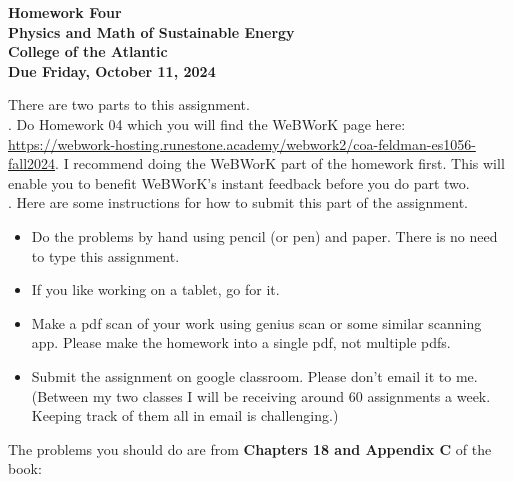 \documentclass[12pt]{article}
\begin{document}
\pagestyle{empty}
 
\begin{center}
{\LARGE {\bf Homework Four}}\\
\bigskip
{\Large {\bf Physics and Math of Sustainable Energy}}\\
\bigskip
{\Large {\bf College of the Atlantic}}\\
\bigskip
{ {\bf Due Friday, October 11, 2024}}\\ 
\end{center}
\medskip


\noindent There are two parts to this assignment.\\

.  Do Homework 04 which you
will find the WeBWorK page here:
\url{https://webwork-hosting.runestone.academy/webwork2/coa-feldman-es1056-fall2024}.
I recommend doing the WeBWorK part of the homework first.  This will
enable you to benefit WeBWorK's instant feedback before you do part
two.\\ 


.  Here are some
instructions for how to submit this part of the assignment.
\begin{itemize}
\item Do the problems by hand using pencil (or pen) and paper.
  There is no need to type this assignment.
\item If you like working on a tablet, go for it. 
\item Make a pdf scan of your work using genius scan or some
  similar scanning app.  Please make the homework into a single
  pdf, not multiple pdfs.
\item Submit the assignment on google classroom.  Please don't
  email it to me.  (Between my two classes I will be receiving
  around 60 assignments a week.  Keeping track of them all in email 
  is challenging.)\\
\end{itemize}



\noindent The problems you should do are from {\bf Chapters 18 and
  Appendix C} of the book:  \\
\end{document}
